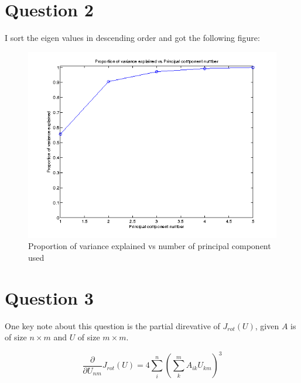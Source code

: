 \documentclass[paper=a4, fontsize=11pt]{scrartcl} %
\numberwithin{equation}{section} %
\numberwithin{figure}{section} %
\numberwithin{table}{section} %
\begin{document}



\section{Question 2}

I sort the eigen values in descending order and got the following figure:

\begin{figure}[H]
  \centering
  \includegraphics[scale=.7]{variance_explained}
  \caption{Proportion of variance explained vs number of principal component used}
\end{figure}

  

\section {Question 3}

One key note about this question is the partial direvative of $J_{rot} (U)$, given $A$ is of size $n \times m$ and $U$ of size $m \times m$.

\[ \frac {\partial} {\partial U_{nm}} J_{rot } (U) = 4 \sum\limits_i^n (\sum\limits_k^m A_{ik} U_{km})^3\]
\end{document}
